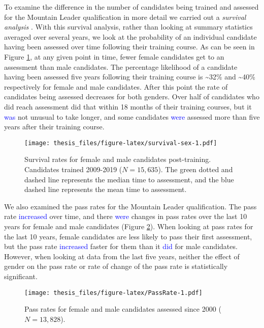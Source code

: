 \documentclass[
  12pt,
  a4paper,
]{book}
\begin{document}
To examine the difference in the number of candidates being trained and assessed for the Mountain Leader qualification in more detail we carried out a \emph{survival analysis} \citep[cf.~][]{HarrellJr2015}. With this survival analysis, rather than looking at summary statistics averaged over several years, we look at the probability of an individual candidate having been assessed over time following their training course. As can be seen in Figure \ref{fig:survival-sex}, at any given point in time, fewer female candidates get to an assessment than male candidates. The percentage likelihood of a candidate having been assessed five years following their training course is \textasciitilde32\% and \textasciitilde40\% respectively for female and male candidates. After this point the rate of candidates being assessed decreases for both genders. Over half of candidates who did reach assessment did that within 18 months of their training courses, but it \textcolor{blue}{was} not unusual to take longer, and some candidates \textcolor{blue}{were} assessed more than five years after their training course.

\begin{figure}
\centering
\texttt{[image: thesis\_files/figure-latex/survival-sex-1.pdf]}
\caption{\label{fig:survival-sex}Survival rates for female and male candidates post-training. Candidates trained 2009-2019 (\(N = 15,635\)). The green dotted and dashed line represents the median time to assessment, and the blue dashed line represents the mean time to assessment.}
\end{figure}

We also examined the pass rates for the Mountain Leader qualification. The pass rate \textcolor{blue}{increased} over time, and there \textcolor{blue}{were} changes in pass rates over the last 10 years for female and male candidates (Figure \ref{fig:PassRate}). When looking at pass rates for the last 10 years, female candidates are less likely to pass their first assessment, but the pass rate \textcolor{blue}{increased} faster for them than it \textcolor{blue}{did} for male candidates. However, when looking at data from the last five years, neither the effect of gender on the pass rate or rate of change of the pass rate is statistically significant.

\begin{figure}
\centering
\texttt{[image: thesis\_files/figure-latex/PassRate-1.pdf]}
\caption{\label{fig:PassRate}Pass rates for female and male candidates assessed since 2000 (\(N = 13,828\)).}
\end{figure}
\end{document}
